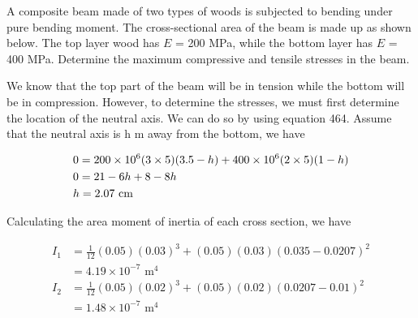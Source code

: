\documentclass[
fontsize=10pt,
a4paper,
twosides=false,
open=any,
svgnames,
]{kaobook} %
\begin{document}
\begin{example}
A composite beam made of two types of woods is subjected to bending under pure bending moment. The cross-sectional area of the beam is made up as shown below. The top layer wood has $E$ = 200 MPa, while the bottom layer has $E$ = 400 MPa. Determine the maximum compressive and tensile stresses in the beam.

\begin{figure}[H]
  \centering
\end{figure}

We know that the top part of the beam will be in tension while the bottom will be in compression. However, to determine the stresses, we must first determine the location of the neutral axis. We can do so by using equation 464. Assume that the neutral axis is h m away from the bottom, we have

\[\begin{gathered}
  0 = 200 \times {10^6}(3 \times 5)(3.5 - h) + 400 \times {10^6}(2 \times 5)(1 - h) \hfill \\
  0 = 21 - 6h + 8 - 8h \hfill \\
  h = 2.07 \text{ cm} \hfill \\ 
\end{gathered} \]

  Calculating the area moment of inertia of each cross section, we have

  \begin{align*}
    I_1 &= \frac{1}{12}(0.05)(0.03)^3 + (0.05)(0.03)(0.035 - 0.0207)^{2} \\
        &= 4.19 \times 10^{-7} \text{ m}^4 \\
    I_2 &= \frac{1}{12}(0.05)(0.02)^3 + (0.05)(0.02)(0.0207 - 0.01)^{2} \\
        &= 1.48 \times 10^{ -7} \text{ m}^4
    \end{align*}


\end{example}
\end{document}
